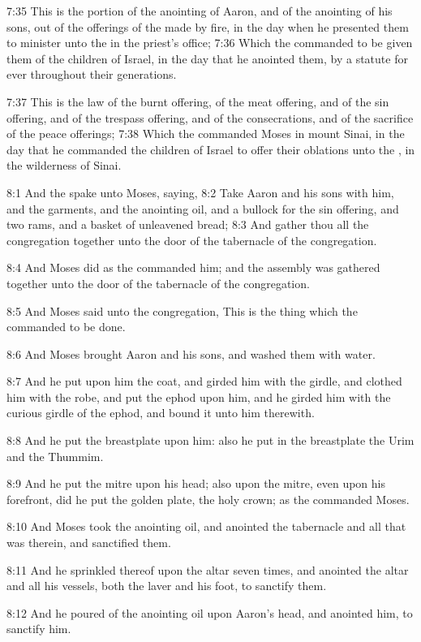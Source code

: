 7:35 This is the portion of the anointing of Aaron, and of the
anointing of his sons, out of the offerings of the \LORD made by fire,
in the day when he presented them to minister unto the \LORD in the
priest's office; 7:36 Which the \LORD commanded to be given them of the
children of Israel, in the day that he anointed them, by a statute for
ever throughout their generations.

7:37 This is the law of the burnt offering, of the meat offering, and
of the sin offering, and of the trespass offering, and of the
consecrations, and of the sacrifice of the peace offerings; 7:38 Which
the \LORD commanded Moses in mount Sinai, in the day that he commanded
the children of Israel to offer their oblations unto the \LORD, in the
wilderness of Sinai.

8:1 And the \LORD spake unto Moses, saying, 8:2 Take Aaron and his sons
with him, and the garments, and the anointing oil, and a bullock for
the sin offering, and two rams, and a basket of unleavened bread; 8:3
And gather thou all the congregation together unto the door of the
tabernacle of the congregation.

8:4 And Moses did as the \LORD commanded him; and the assembly was
gathered together unto the door of the tabernacle of the congregation.

8:5 And Moses said unto the congregation, This is the thing which the
\LORD commanded to be done.

8:6 And Moses brought Aaron and his sons, and washed them with water.

8:7 And he put upon him the coat, and girded him with the girdle, and
clothed him with the robe, and put the ephod upon him, and he girded
him with the curious girdle of the ephod, and bound it unto him
therewith.

8:8 And he put the breastplate upon him: also he put in the
breastplate the Urim and the Thummim.

8:9 And he put the mitre upon his head; also upon the mitre, even upon
his forefront, did he put the golden plate, the holy crown; as the
\LORD commanded Moses.

8:10 And Moses took the anointing oil, and anointed the tabernacle and
all that was therein, and sanctified them.

8:11 And he sprinkled thereof upon the altar seven times, and anointed
the altar and all his vessels, both the laver and his foot, to
sanctify them.

8:12 And he poured of the anointing oil upon Aaron's head, and
anointed him, to sanctify him.

